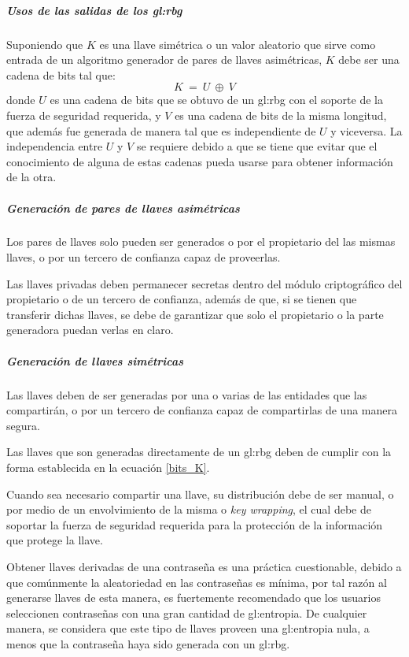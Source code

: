 \subparagraph{Usos de las salidas de los \gls{gl:rbg}}
Suponiendo que $K$ es una llave simétrica o un valor aleatorio que sirve
como entrada de un algoritmo generador de pares de llaves asimétricas, $K$
debe ser una cadena de bits tal que:
\begin{equation}
  \label{bits_K}
  K\: =\: U\: \oplus\: V
\end{equation}
donde $U$ es una cadena de bits que se obtuvo de un \gls{gl:rbg} con el
soporte de la fuerza de seguridad requerida, y $V$ es una cadena de bits de la
misma longitud, que además fue generada de manera tal que es independiente de
$U$ y viceversa. La independencia entre $U$ y $V$ se requiere debido a que se
tiene que evitar que el conocimiento de alguna de estas cadenas pueda usarse
para obtener información de la otra.

\subparagraph{Generación de pares de llaves asimétricas}
Los pares de llaves solo pueden ser generados o por el propietario del las
mismas llaves, o por un tercero de confianza capaz de proveerlas.

Las llaves privadas deben permanecer secretas dentro del módulo criptográfico
del propietario o de un tercero de confianza, además de que, si se tienen que
transferir dichas llaves, se debe de garantizar que solo el propietario o la
parte generadora puedan verlas en claro.

\subparagraph{Generación de llaves simétricas}
Las llaves deben de ser generadas por una o varias de las entidades que
las compartirán, o por un tercero de confianza capaz de compartirlas de una
manera segura.

Las llaves que son generadas directamente de un \gls{gl:rbg} deben de cumplir
con la forma establecida en la ecuación \ref{bits_K}.

Cuando sea necesario compartir una llave, su distribución debe de ser manual,
o por medio de un envolvimiento de la misma o \textit{key wrapping}, el cual
debe de soportar la fuerza de seguridad requerida para la protección de la
información que protege la llave.

Obtener llaves derivadas de una contraseña es una práctica cuestionable,
debido a que comúnmente la aleatoriedad en las contraseñas es mínima, por tal
razón al generarse llaves de esta manera, es fuertemente recomendado que los
usuarios seleccionen contraseñas con una gran cantidad de \gls{gl:entropia}.
De cualquier manera, se considera que este tipo de llaves proveen una
\gls{gl:entropia} nula, a menos que la contraseña haya sido generada con
un \gls{gl:rbg}.

